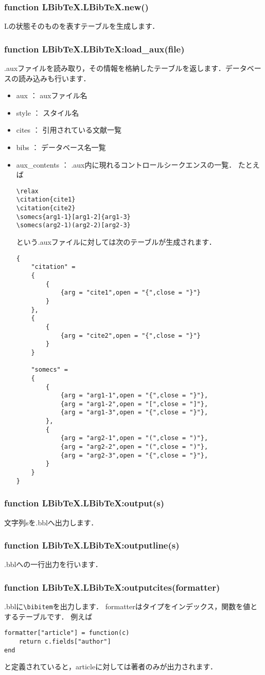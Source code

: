 \documentclass[dvipdfmx,a4paper]{jsarticle}
\DeclareRobustCommand{\LBibTeX}{L\BibTeX}
\begin{document}
\subsubsection{function LBibTeX.LBibTeX.new()}
\LBibTeX の状態そのものを表すテーブルを生成します．

\subsubsection{function LBibTeX.LBibTeX:load\_aux(file)}
.auxファイルを読み取り，その情報を格納したテーブルを返します．データベースの読み込みも行います．
\begin{itemize}
\item aux ： auxファイル名
\item style ： スタイル名
\item cites ： 引用されている文献一覧
\item bibs ： データベース名一覧
\item aux\_contents ： .aux内に現れるコントロールシークエンスの一覧．
たとえば
\begin{verbatim}
\relax
\citation{cite1}
\citation{cite2}
\somecs{arg1-1}[arg1-2]{arg1-3}
\somecs(arg2-1)(arg2-2)[arg2-3}
\end{verbatim}
という.auxファイルに対しては次のテーブルが生成されます．
\begin{lstlisting}
{
	"citation" = 
	{
		{
			{arg = "cite1",open = "{",close = "}"}
		}
	},
	{
		{
			{arg = "cite2",open = "{",close = "}"}
		}
	}
	
	"somecs" = 
	{
		{
			{arg = "arg1-1",open = "{",close = "}"},
			{arg = "arg1-2",open = "[",close = "]"},
			{arg = "arg1-3",open = "{",close = "}"},
		},
		{
			{arg = "arg2-1",open = "(",close = ")"},
			{arg = "arg2-2",open = "(",close = ")"},
			{arg = "arg2-3",open = "{",close = "}"},
		}
	}
}
\end{lstlisting}
\end{itemize}

\subsubsection{function LBibTeX.LBibTeX:output(s)}
文字列sを.bblへ出力します．

\subsubsection{function LBibTeX.LBibTeX:outputline(s)}
.bblへの一行出力を行います．

\subsubsection{function LBibTeX.LBibTeX:outputcites(formatter)}
.bblに\verb|\bibitem|を出力します．
formatterはタイプをインデックス，関数を値とするテーブルです．
例えば
\begin{lstlisting}
formatter["article"] = function(c)
	return c.fields["author"]
end
\end{lstlisting}
と定義されていると，articleに対しては著者のみが出力されます．
\end{document}
